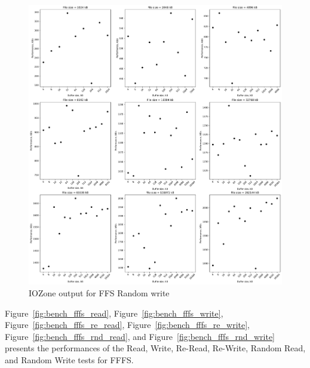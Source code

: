 \begin{figure}[!htb]
	\label{fig:bench_ffs_rnd_write}
	\begin{center}
		\includegraphics[width=1.0\textwidth]{figures/benchmarking/ffs/Random write.pdf}
	\end{center}
	\caption{IOZone output for FFS Random write}
\end{figure}

\FloatBarrier

Figure~\ref{fig:bench_fffs_read}, Figure~\ref{fig:bench_fffs_write}, Figure~\ref{fig:bench_fffs_re_read}, Figure~\ref{fig:bench_fffs_re_write}, Figure~\ref{fig:bench_fffs_rnd_read}, and Figure~\ref{fig:bench_fffs_rnd_write} presents the performances of the Read, Write, \mbox{Re-Read}, \mbox{Re-Write}, Random Read, and Random Write tests for \gls{FFFS}.


